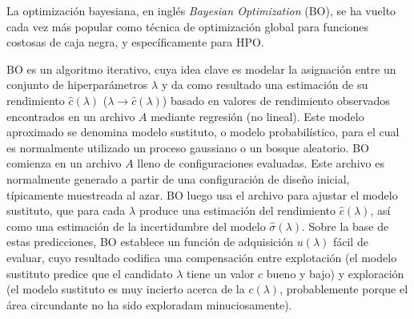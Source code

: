 
La optimización bayesiana, en inglés \textit{Bayesian Optimization} (BO), se ha vuelto cada vez más popular como técnica de optimización global para funciones costosas de caja negra, y específicamente para HPO.

BO es un algoritmo iterativo, cuya idea clave es modelar la asignación entre un conjunto de hiperparámetros $\lambda$ y da como resultado una estimación de su rendimiento $\hat{c}(\lambda)$ ($\lambda \rightarrow \hat{c}(\lambda)$) basado en valores de rendimiento observados encontrados en un archivo $A$ mediante regresión (no lineal). Este modelo aproximado se denomina modelo sustituto, o modelo probabilístico, para el cual es normalmente utilizado un proceso gaussiano o un bosque aleatorio. BO comienza en un archivo $A$ lleno de configuraciones evaluadas. Este archivo es normalmente generado a partir de una configuración de diseño inicial, típicamente muestreada al azar. BO luego usa el archivo para ajustar el modelo sustituto, que para cada $\lambda$ produce una estimación del rendimiento $\hat{c}(\lambda)$, así como una estimación de la incertidumbre del modelo $\hat{\sigma}(\lambda)$. Sobre la base de estas predicciones, BO establece un función de adquisición $u(\lambda)$ fácil de evaluar, cuyo resultado codifica una compensación entre explotación (el modelo sustituto predice que el candidato $\lambda$ tiene un valor $c$ bueno y bajo) y exploración (el modelo sustituto es muy incierto acerca de la $c(\lambda)$, probablemente porque el área circundante no ha sido exploradam minuciosamente).

